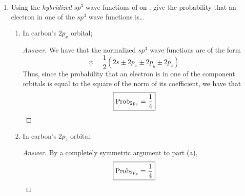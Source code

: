 \documentclass[../psets.tex]{subfiles}
\begin{document}
\begin{enumerate}
\begin{enumerate}
\begin{proof}[Answer]
\begin{center}
            \end{center}
        \end{proof}
        \item With Grassmann notation, express the MO ground-state wave function for .
        \begin{proof}[Answer]
            We have that
            \begin{equation*}
                \psi(1,2,3,4,5,6) = 1s\alpha(1)\wedge 1s\beta(2)\wedge 1\sigma_g\alpha(3)\wedge 1\sigma_g\beta(4)\wedge 2\sigma_g\alpha(5)\wedge 2\sigma_g\beta(6)
            \end{equation*}
        \end{proof}
    \end{enumerate}
    \item Using the \emph{hybridized} $sp^3$ wave functions of  on \textcite[376]{bib:McQuarrieSimon}, give the probability that an electron in one of the $sp^3$ wave functions is\dots
    \begin{enumerate}
        \item In carbon's $2p_x$ orbital;
        \begin{proof}[Answer]
            We have that the normalized $sp^3$ wave functions are of the form
            \begin{equation*}
                \psi = \frac{1}{2}(2s\pm 2p_x\pm 2p_y\pm 2p_z)
            \end{equation*}
            Thus, since the probability that an electron is in one of the component orbitals is equal to the square of the norm of its coefficient, we have that
            \begin{equation*}
                \boxed{\operatorname{Prob}_{2p_x} = \frac{1}{4}}
            \end{equation*}
        \end{proof}
        \item In carbon's $2p_z$ orbital.
        \begin{proof}[Answer]
            By a completely symmetric argument to part (a),
            \begin{equation*}
                \boxed{\operatorname{Prob}_{2p_z} = \frac{1}{4}}
            \end{equation*}

\end{proof}
\end{enumerate}
\end{enumerate}
\end{document}
